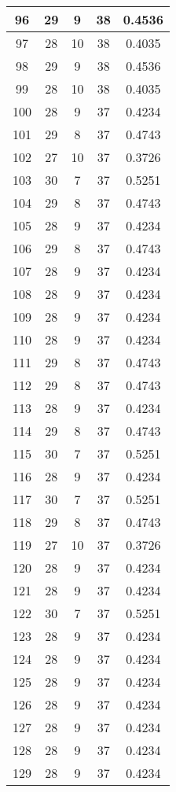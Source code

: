 \documentclass[letterpaper, 12pt]{article}
\begin{document}
\begin{longtable}{|c|c|c|c|c|}
\hline
96 & 29 & 9 & 38 & 0.4536 \\
\hline
97 & 28 & 10 & 38 & 0.4035 \\
\hline
98 & 29 & 9 & 38 & 0.4536 \\
\hline
99 & 28 & 10 & 38 & 0.4035 \\
\hline
100 & 28 & 9 & 37 & 0.4234 \\
\hline
101 & 29 & 8 & 37 & 0.4743 \\
\hline
102 & 27 & 10 & 37 & 0.3726 \\
\hline
103 & 30 & 7 & 37 & 0.5251 \\
\hline
104 & 29 & 8 & 37 & 0.4743 \\
\hline
105 & 28 & 9 & 37 & 0.4234 \\
\hline
106 & 29 & 8 & 37 & 0.4743 \\
\hline
107 & 28 & 9 & 37 & 0.4234 \\
\hline
108 & 28 & 9 & 37 & 0.4234 \\
\hline
109 & 28 & 9 & 37 & 0.4234 \\
\hline
110 & 28 & 9 & 37 & 0.4234 \\
\hline
111 & 29 & 8 & 37 & 0.4743 \\
\hline
112 & 29 & 8 & 37 & 0.4743 \\
\hline
113 & 28 & 9 & 37 & 0.4234 \\
\hline
114 & 29 & 8 & 37 & 0.4743 \\
\hline
115 & 30 & 7 & 37 & 0.5251 \\
\hline
116 & 28 & 9 & 37 & 0.4234 \\
\hline
117 & 30 & 7 & 37 & 0.5251 \\
\hline
118 & 29 & 8 & 37 & 0.4743 \\
\hline
119 & 27 & 10 & 37 & 0.3726 \\
\hline
120 & 28 & 9 & 37 & 0.4234 \\
\hline
121 & 28 & 9 & 37 & 0.4234 \\
\hline
122 & 30 & 7 & 37 & 0.5251 \\
\hline
123 & 28 & 9 & 37 & 0.4234 \\
\hline
124 & 28 & 9 & 37 & 0.4234 \\
\hline
125 & 28 & 9 & 37 & 0.4234 \\
\hline
126 & 28 & 9 & 37 & 0.4234 \\
\hline
127 & 28 & 9 & 37 & 0.4234 \\
\hline
128 & 28 & 9 & 37 & 0.4234 \\
\hline
129 & 28 & 9 & 37 & 0.4234 \\

\end{longtable}
\end{document}

